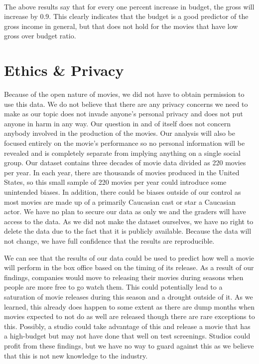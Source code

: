 \documentclass[11pt]{article}
\begin{document}
    \begin{center}
    \end{center}
    { \hspace*{\fill} \\}
    
    The above results say that for every one percent increase in budget, the
gross will increase by 0.9. This clearly indicates that the budget is a
good predictor of the gross income in general, but that does not hold
for the movies that have low gross over budget ratio.

    \section{Ethics \& Privacy}\label{ethics-privacy}

    Because of the open nature of movies, we did not have to obtain
permission to use this data. We do not believe that there are any
privacy concerns we need to make as our topic does not invade anyone's
personal privacy and does not put anyone in harm in any way. Our
question in and of itself does not concern anybody involved in the
production of the movies. Our analysis will also be focused entirely on
the movie's performance so no personal information will be revealed and
is completely separate from implying anything on a single social group.
Our dataset contains three decades of movie data divided as 220 movies
per year. In each year, there are thousands of movies produced in the
United States, so this small sample of 220 movies per year could
introduce some unintended biases. In addition, there could be biases
outside of our control as most movies are made up of a primarily
Caucasian cast or star a Caucasian actor. We have no plan to secure our
data as only we and the graders will have access to the data. As we did
not make the dataset ourselves, we have no right to delete the data due
to the fact that it is publicly available. Because the data will not
change, we have full confidence that the results are reproducible.

We can see that the results of our data could be used to predict how
well a movie will perform in the box office based on the timing of its
release. As a result of our findings, companies would move to releasing
their movies during seasons when people are more free to go watch them.
This could potentially lead to a saturation of movie releases during
this season and a drought outside of it. As we learned, this already
does happen to some extent as there are dump months when movies expected
to not do as well are released though there are rare exceptions to this.
Possibly, a studio could take advantage of this and release a movie that
has a high-budget but may not have done that well on test screenings.
Studios could profit from these findings, but we have no way to guard
against this as we believe that this is not new knowledge to the
industry.
\end{document}
